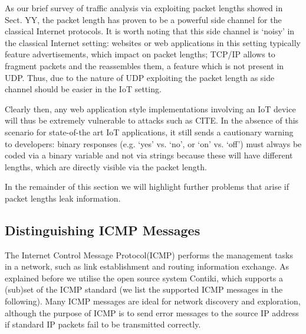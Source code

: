 \documentclass{article}
\begin{document}
As our brief survey of traffic analysis via exploiting packet lengths showed in Sect. YY, the packet length has proven to be a powerful side channel for the classical Internet protocols. It is worth noting that this side channel is `noisy' in the classical Internet setting: websites or web applications in this setting typically feature advertisements, which impact on packet lengths; TCP/IP allows to fragment packets and the reassembles them, a feature which is not present in UDP. Thus, due to the nature of UDP exploiting the packet length as side channel should be easier in the IoT setting.

Clearly then, any web application style implementations involving an IoT device will thus be extremely vulnerable to attacks such as CITE. In the absence of this scenario for state-of-the art IoT applications, it still sends a cautionary warning to developers: binary responses (e.g. `yes' vs. `no', or `on' vs. `off') must always be coded via a binary variable and not via strings because these will have different lengths, which are directly visible via the packet length.

In the remainder of this section we will highlight further problems that arise if packet lengths leak information.

\subsection{Distinguishing ICMP Messages}
The Internet Control Message Protocol(ICMP)\cite{rfc4443} performs the management tasks in a network, such as link establishment and routing information exchange. As explained before we utilise the open source system Contiki, which supports a (sub)set of the ICMP standard (we list the supported ICMP messages in the following). Many ICMP messages are ideal for network discovery and exploration, although the purpose of ICMP is to send error messages to the source IP address if standard IP packets fail to be transmitted correctly. 
\end{document}
